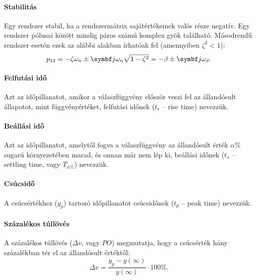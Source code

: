 \paragraph{Stabilitás}

Egy rendszer stabil, ha a rendszermátrix sajátértékeinek valós része negatív.
Egy rendszer pólusai között mindig páros számú komplex gyök található.
Másodrendű rendszer esetén ezek az alábbi alakban írhatóak fel (amennyiben
$\zeta^2 < 1$):
\begin{equation}
  p_{12}
  = -\zeta \omega_n \pm \iu \omega_n \sqrt{1 - \zeta^2}
  = -\beta \pm \iu \omega_d.
  \label{eq:complex-poles}
\end{equation}

\paragraph{Felfutási idő}

Azt az időpillanatot, amikor a válaszfüggvény először veszi fel az állandósult
állapotot, mint függvényértéket, felfutási időnek ($t_r$ -- rise time) nevezzük.

\paragraph{Beállási idő}

Azt az időpillanatot, amelytől fogva a válaszfüggvény az állandósult érték
$\alpha\%$ sugarú környezetében marad, és onnan már nem lép ki, beállási időnek
($t_s$ -- settling time, vagy $T_{\alpha\%}$) nevezzük.

\paragraph{Csúcsidő}

A csúcsértékhez ($y_p$) tartozó időpillanatot csúcsidőnek ($t_p$ -- peak time)
nevezzük.

\paragraph{Százalékos túllövés}

A százalékos túllövés ($\Delta v$, vagy $\mathit{PO}$) megmutatja, hogy a
csúcsérték hány százalékban tér el az állandósult értéktől:
\begin{equation}
  \Delta v = \frac{y_p - y(\infty)}{y(\infty)} \cdot 100\%.
  \label{eq:PO}
\end{equation}

